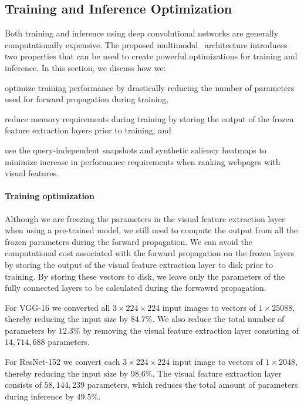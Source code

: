 \subsection{Training and Inference Optimization}
Both training and inference using deep convolutional networks are generally computationally expensive.
The proposed multimodal \modelname~architecture introduces two properties that can be used to create powerful optimizations for training and inference. In this section, we discuss how we: \begin{inparaenum}[(i)]
\item optimize training performance by drastically reducing the number of parameters used for forward propagation during training, 
\item reduce memory requirements during training by storing the output of the frozen feature extraction layers prior to training, and
\item use the query-independent snapshots and synthetic saliency heatmaps to minimize increase in performance requirements when ranking webpages with visual features.
\end{inparaenum}

\paragraph{Training optimization}
Although we are freezing the parameters in the visual feature extraction layer when using a pre-trained model, we still need to compute the output from all the frozen parameters during the forward propagation. We can avoid the computational cost associated with the forward propagation on the frozen layers by storing the output of the visual feature extraction layer to disk prior to training. By storing these vectors to disk, we leave only the parameters of the fully connected layers to be calculated during the forwawrd propagation. 

For VGG-16 we converted all $3\times224\times224$ input images to vectors of $1\times25088$, thereby reducing the input size by $84.7\%$. We also reduce the total number of parameters by $12.3\%$ by removing the visual feature extraction layer consisting of $14,714,688$ parameters.

For ResNet-152 we convert each $3\times224\times224$ input image to vectors of $1\times2048$, thereby reducing the input size by $98.6\%$. The visual feature extraction layer consists of $58,144,239$ parameters, which reduces the total amount of parameters during inference by $49.5\%$.

